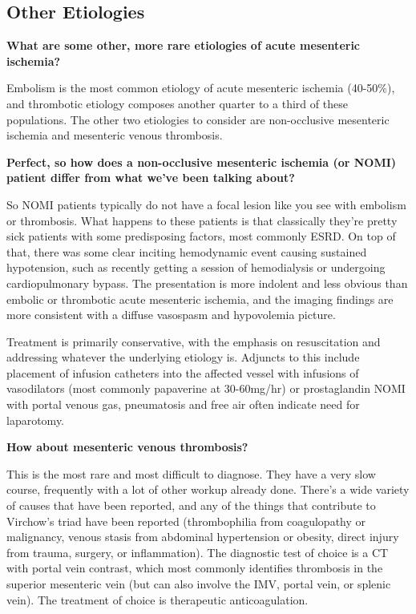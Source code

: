 \documentclass[
]{book}
\begin{document}
\hypertarget{other-etiologies}{%
\subsection{Other Etiologies}\label{other-etiologies}}

\textbf{What are some other, more rare etiologies of acute mesenteric
ischemia?}

Embolism is the most common etiology of acute mesenteric ischemia
(40-50\%), and thrombotic etiology composes another quarter to a third of
these populations. The other two etiologies to consider are
non-occlusive mesenteric ischemia and mesenteric venous thrombosis.

\textbf{Perfect, so how does a non-occlusive mesenteric ischemia (or NOMI)
patient differ from what we've been talking about?}

So NOMI patients typically do not have a focal lesion like you see with
embolism or thrombosis. What happens to these patients is that
classically they're pretty sick patients with some predisposing factors,
most commonly ESRD. On top of that, there was some clear inciting
hemodynamic event causing sustained hypotension, such as recently
getting a session of hemodialysis or undergoing cardiopulmonary bypass.
The presentation is more indolent and less obvious than embolic or
thrombotic acute mesenteric ischemia, and the imaging findings are more
consistent with a diffuse vasospasm and hypovolemia picture.

Treatment is primarily conservative, with the emphasis on resuscitation
and addressing whatever the underlying etiology is. Adjuncts to this
include placement of infusion catheters into the affected vessel with
infusions of vasodilators (most commonly papaverine at 30-60mg/hr) or
prostaglandin \citep{wyersmarkcandmartin133AcuteMesenteric2019, trompeterNonocclusiveMesentericIschemia2002} NOMI with portal venous
gas, pneumatosis and free air often indicate need for laparotomy.

\textbf{How about mesenteric venous thrombosis?}

This is the most rare and most difficult to diagnose. They have a very
slow course, frequently with a lot of other workup already done. There's
a wide variety of causes that have been reported, and any of the things
that contribute to Virchow's triad have been reported (thrombophilia
from coagulopathy or malignancy, venous stasis from abdominal
hypertension or obesity, direct injury from trauma, surgery, or
inflammation). The diagnostic test of choice is a CT with portal vein
contrast, which most commonly identifies thrombosis in the superior
mesenteric vein (but can also involve the IMV, portal vein, or splenic
vein). The treatment of choice is therapeutic
anticoagulation.\citep{acosta2019}
\end{document}
